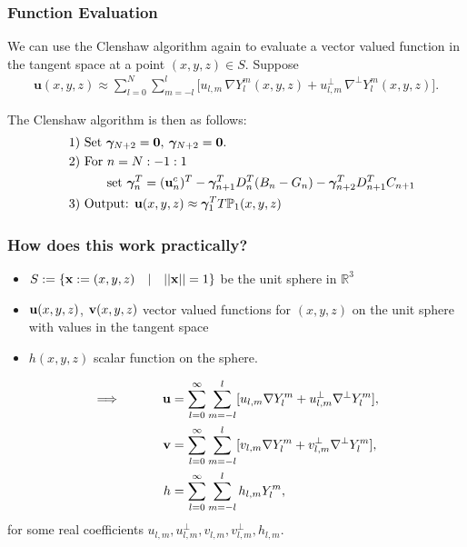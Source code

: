 \documentclass[10pt]{beamer}
\newcommand{\R}{\mathbb{R}}
\newcommand{\Ylm}{Y^m_l}
\newcommand{\gradP}{T\mathbb{P}}
\newcommand{\gradYlm}{\nabla Y^m_l}
\newcommand{\gradpYlm}{\nabla^\perp Y^m_l}
\begin{document}
\frame
{
    \frametitle{Function Evaluation}
    
We can use the Clenshaw algorithm again to evaluate a vector valued function in the tangent space at a point $(x,y,z) \in S$. Suppose
\begin{align}
\mathbf{u}(x,y,z) \approx \sum^N_{l=0} \sum^l_{m=-l} \big[u_{l,m} \, \gradYlm(x,y,z)  + u^\perp_{l,m} \, \gradpYlm(x,y,z) \big].
\end{align}

The Clenshaw algorithm is then as follows:
\begin{align*}
\quad &\text{1) } \text{Set } \bm{\gamma}_{N+2} = \bold{0}, \: \bm{\gamma}_{N+2} = \bold{0}. \\
\quad &\text{2) } \text{For } n = N:-1:1 \\
\quad & \quad \quad \quad \text{set } \bm{\gamma}_{n}^T = (\mathbf{u}^c_n)^T - \bm{\gamma}_{n+1}^T D^T_n (B_n - G_n) -  \bm{\gamma}_{n+2}^T D^T_{n+1}C_{n+1} \\
\quad &\text{3) } \text{Output: } \mathbf{u}(x,y,z) \approx \bm{\gamma}_{1}^T \gradP_1(x,y,z)
\end{align*}

}

\frame
{
    \frametitle{How does this work practically?}

\begin{itemize}

\item \(S := \{ \bold{x} := (x,y,z) \quad | \quad ||\bold{x}|| = 1\}\) be the unit sphere in \(\R^3\)

\item \(\bold{u}(x,y,z)\), \(\bold{v}(x,y,z)\) vector valued functions for \((x,y,z)\) on the unit sphere with values in the tangent space 

\item \(h(x,y,z)\) scalar function on the sphere.

\end{itemize}

\begin{align}
\implies \quad \quad \quad \bold{u} &= \sum_{l=0}^{\infty} \sum_{m=-l}^{l} [ u_{l,m} \gradYlm + u^{\perp}_{l,m} \gradpYlm ], \\
\bold{v} &= \sum_{l=0}^{\infty} \sum_{m=-l}^{l} [ v_{l,m} \gradYlm + v^{\perp}_{l,m} \gradpYlm ], \\
h &= \sum_{l=0}^{\infty} \sum_{m=-l}^{l} h_{l,m} \Ylm,
\end{align}
for some real coefficients \(u_{l,m}, u^{\perp}_{l,m}, v_{l,m}, v^{\perp}_{l,m}, h_{l,m}\). 

}
\end{document}
